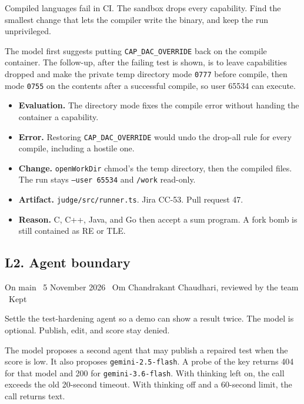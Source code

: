 \documentclass[11pt,a4paper]{article}
\newcommand{\meta}[1]{{\small #1}\par}
\newcommand{\step}[1]{\par\vspace{0.15em}{\bfseries #1}\par\vspace{-0.15em}}
\begin{document}
\step{1. Prompt}
Compiled languages fail in CI. The sandbox drops every capability. Find the smallest change that lets the compiler write the binary, and keep the run unprivileged.

\step{2. Reply (summarised)}
The model first suggests putting \texttt{CAP\_DAC\_OVERRIDE} back on the compile container. The follow-up, after the failing test is shown, is to leave capabilities dropped and make the private temp directory mode \texttt{0777} before compile, then mode \texttt{0755} on the contents after a successful compile, so user 65534 can execute.

\step{3. Decision}
\begin{itemize}
\item \textbf{Evaluation.} The directory mode fixes the compile error without handing the container a capability.
\item \textbf{Error.} Restoring \texttt{CAP\_DAC\_OVERRIDE} would undo the drop-all rule for every compile, including a hostile one.
\item \textbf{Change.} \texttt{openWorkDir} chmod's the temp directory, then the compiled files. The run stays \texttt{--user 65534} and \texttt{/work} read-only.
\item \textbf{Artifact.} \texttt{judge/src/runner.ts}. Jira CC-53. Pull request 47.
\item \textbf{Reason.} C, C++, Java, and Go then accept a sum program. A fork bomb is still contained as RE or TLE.
\end{itemize}

\subsection{L2. Agent boundary}
\meta{On main \textperiodcentered\ 5 November 2026 \textperiodcentered\ Om Chandrakant Chaudhari, reviewed by the team \textperiodcentered\ Kept}

\step{1. Prompt}
Settle the test-hardening agent so a demo can show a result twice. The model is optional. Publish, edit, and score stay denied.

\step{2. Reply (summarised)}
The model proposes a second agent that may publish a repaired test when the score is low. It also proposes \texttt{gemini-2.5-flash}. A probe of the key returns 404 for that model and 200 for \texttt{gemini-3.6-flash}. With thinking left on, the call exceeds the old 20-second timeout. With thinking off and a 60-second limit, the call returns text.
\end{document}
